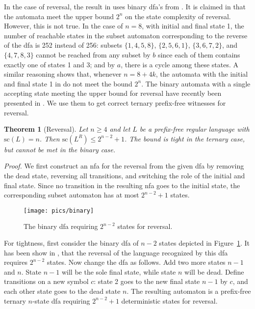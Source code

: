 \documentclass[copyright]{eptcs}
\newtheorem{theorem}{Theorem}
\renewcommand{\sc}{\mathrm{sc}}
\renewcommand{\le}{\leqslant}
\renewcommand{\ge}{\geqslant}
\begin{document}
  In the case of reversal, the result in \cite{hs09}
  uses  binary dfa's from \cite{swy04}.
  It is claimed in \cite[Theorem~3]{swy04} that 
  the automata meet the upper bound $2^n$
  on the state complexity of reversal. However, this is not  true.
  In the case of $n=8$, with initial and final state 1,
  the number of reachable states in the subset automaton 
  corresponding to the reverse of
  the dfa is 252 instead of 256: subsets 
  $\{1,4,5,8\}$, $ \{2,5,6,1\}$, $\{3,6,7,2\}$, and $\{4,7,8,3\}$
  cannot be reached from any subset by $b$ 
  since each of them  contains exactly one of states 1 and 3; 
  and by $a$, there is a cycle among these states.
  A similar reasoning shows that, whenever $n=8+4k$,
  the automata with the initial and final state 1 in \cite{swy04}
  do not meet the bound $2^n$.
  The  binary automata with a single accepting state 
  meeting the upper bound for reversal
  have recently been presented in \cite{se10}.
  We use them to get correct ternary prefix-free witnesses for reversal.

 \begin{theorem}[Reversal]\label{thm:sc_reversal}
  Let $n\ge4$ and let $L$ be a prefix-free regular language with $\sc(L)=n$.
  Then $\sc(L^R)\le 2^{n-2}+1$. The bound is tight in the ternary case,
  but cannot be met in the binary case. 
 \end{theorem}

 \noindent\emph{Proof.}
  We first construct an nfa for the reversal from the given dfa
  by removing the dead state,
  reversing all transitions,
  and switching the role of the initial and final state.
  Since no transition in the resulting nfa goes to the initial state,
  the corresponding subset automaton has at most $2^{n-2}+1$  states.
  
  \begin{figure}[t]
  \centerline{\texttt{[image: pics/binary]}}
  \caption{The binary dfa requiring $2^{n-2}$ states for reversal.}
  \label{fig:binary}
  \end{figure} 

  For tightness, first consider  the binary dfa of $n-2$ states
  depicted in Figure~\ref{fig:binary}.
  It has been show in \cite{se10}, that the reversal of the language
  recognized by this dfa requires $2^{n-2}$ states.
  Now change the dfa as follows.
  Add two more states $n-1$ and $n$.
  State $n-1$ will be the sole final state, while state $n$ will be dead.
  Define transitions on a new symbol $c$:
  state 2 goes to the new final state $n-1$ by $c$,
  and each other state  goes to the dead state $n$.
  The resulting automaton is a prefix-free ternary $n$-state dfa 
  requiring $2^{n-2}+1$ deterministic states for reversal.
 
\end{document}
